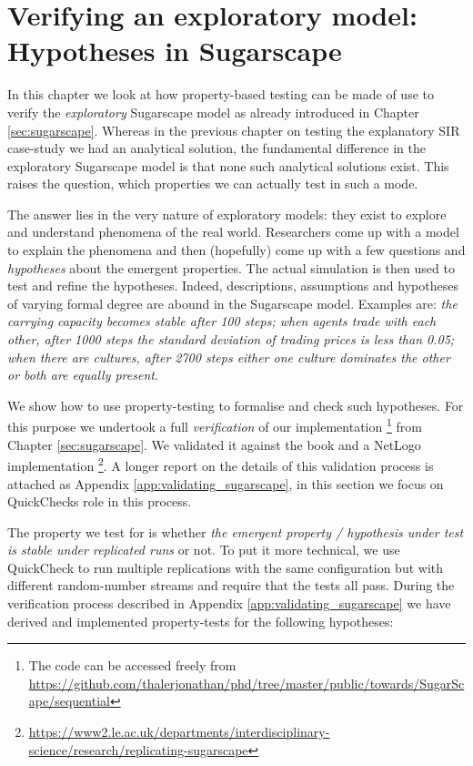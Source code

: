 \chapter{Verifying an exploratory model: \\ Hypotheses in Sugarscape}
\label{ch:prop_exploratory}

In this chapter we look at how property-based testing can be made of use to verify the \textit{exploratory} Sugarscape model \cite{epstein_growing_1996} as already introduced in Chapter \ref{sec:sugarscape}. Whereas in the previous chapter on testing the explanatory SIR case-study we had an analytical solution, the fundamental difference in the exploratory Sugarscape model is that none such analytical solutions exist. This raises the question, which properties we can actually test in such a mode.

The answer lies in the very nature of exploratory models: they exist to explore and understand phenomena of the real world. Researchers come up with a model to explain the phenomena and then (hopefully) come up with a few questions and  \textit{hypotheses} about the emergent properties. The actual simulation is then used to test and refine the hypotheses. Indeed, descriptions, assumptions and hypotheses of varying formal degree are abound in the Sugarscape model. Examples are: \textit{the carrying capacity becomes stable after 100 steps; when agents trade with each other, after 1000 steps the standard deviation of trading prices is less than 0.05; when there are cultures, after 2700 steps either one culture dominates the other or both are equally present}. 

We show how to use property-testing to formalise and check such hypotheses. For this purpose we undertook a full \textit{verification} of our implementation \footnote{The code can be accessed freely from \url{https://github.com/thalerjonathan/phd/tree/master/public/towards/SugarScape/sequential}} from Chapter \ref{sec:sugarscape}. We validated it against the book \cite{epstein_growing_1996} and a NetLogo implementation \cite{weaver_replicating_2009} \footnote{\url{https://www2.le.ac.uk/departments/interdisciplinary-science/research/replicating-sugarscape}}. A longer report on the details of this validation process is attached as Appendix \ref{app:validating_sugarscape}, in this section we focus on QuickChecks role in this process.

The property we test for is whether \textit{the emergent property / hypothesis under test is stable under replicated runs} or not. To put it more technical, we use QuickCheck to run multiple replications with the same configuration but with different random-number streams and require that the tests all pass. During the verification process described in Appendix \ref{app:validating_sugarscape} we have derived and implemented property-tests for the following hypotheses:

